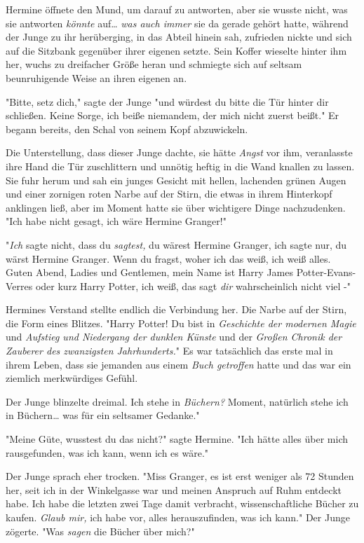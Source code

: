 {Hermine öffnete den Mund, um darauf zu antworten, aber sie wusste nicht, was sie antworten \emph{könnte} auf… \emph{was auch immer} sie da gerade gehört hatte, während der Junge zu ihr herüberging, in das Abteil hinein sah, zufrieden nickte und sich auf die Sitzbank gegenüber ihrer eigenen setzte. Sein Koffer wieselte hinter ihm her, wuchs zu dreifacher Größe heran und schmiegte sich auf seltsam beunruhigende Weise an ihren eigenen an.

"Bitte, setz dich," sagte der Junge "und würdest du bitte die Tür hinter dir schließen. Keine Sorge, ich beiße niemandem, der mich nicht zuerst beißt." Er begann bereits, den Schal von seinem Kopf abzuwickeln.

Die Unterstellung, dass dieser Junge dachte, sie hätte \emph{Angst} vor ihm, veranlasste ihre Hand die Tür zuschlittern und unnötig heftig in die Wand knallen zu lassen. Sie fuhr herum und sah ein junges Gesicht mit hellen, lachenden grünen Augen und einer zornigen roten Narbe auf der Stirn, die etwas in ihrem Hinterkopf anklingen ließ, aber im Moment hatte sie über wichtigere Dinge nachzudenken. "Ich habe nicht gesagt, ich wäre Hermine Granger!"

"\emph{Ich} sagte nicht, dass du \emph{sagtest,} du wärest Hermine Granger, ich sagte nur, du wärst Hermine Granger. Wenn du fragst, woher ich das weiß, ich weiß alles. Guten Abend, Ladies und Gentlemen, mein Name ist Harry James Potter-Evans-Verres oder kurz Harry Potter, ich weiß, das sagt \emph{dir} wahrscheinlich nicht viel -"

Hermines Verstand stellte endlich die Verbindung her. Die Narbe auf der Stirn, die Form eines Blitzes. "Harry Potter! Du bist in \emph{Geschichte der modernen Magie} und \emph{Aufstieg und Niedergang der dunklen Künste} und der \emph{Großen Chronik der Zauberer des zwanzigsten Jahrhunderts.}" Es war tatsächlich das erste mal in ihrem Leben, dass sie jemanden aus einem \emph{Buch getroffen} hatte und das war ein ziemlich merkwürdiges Gefühl.

Der Junge blinzelte dreimal. Ich stehe in \emph{Büchern?} Moment, natürlich stehe ich in Büchern… was für ein seltsamer Gedanke."

"Meine Güte, wusstest du das nicht?" sagte Hermine. "Ich hätte alles über mich rausgefunden, was ich kann, wenn ich es wäre."

Der Junge sprach eher trocken. "Miss Granger, es ist erst weniger als 72 Stunden her, seit ich in der Winkelgasse war und meinen Anspruch auf Ruhm entdeckt habe. Ich habe die letzten zwei Tage damit verbracht, wissenschaftliche Bücher zu kaufen. \emph{Glaub mir,} ich habe vor, alles herauszufinden, was ich kann." Der Junge zögerte. "Was \emph{sagen} die Bücher über mich?"

}
